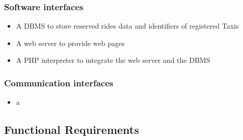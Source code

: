 		\subsubsection{Software interfaces}
		\begin{itemize}
			\item A DBMS to store reserved rides data and identifiers of registered Taxis
			\item A web server to provide web pages
			\item A PHP interpreter to integrate the web server and the DBMS
		\end{itemize}
		\subsubsection{Communication interfaces}
		\begin{itemize}
			\item a 
		\end{itemize}
	\subsection{Functional Requirements}
